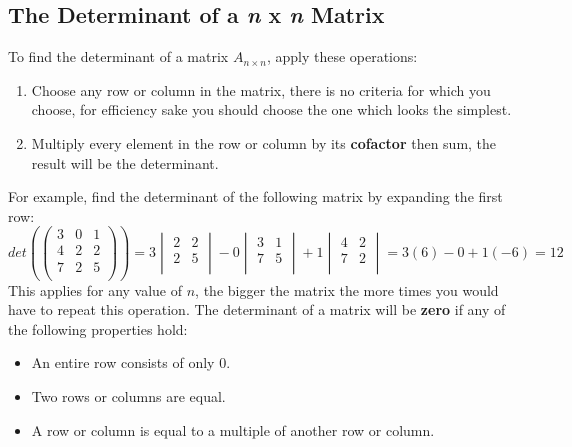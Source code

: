 \documentclass[a4paper]{article}
\begin{document}
  \subsection{The Determinant of a \textit{n} x \textit{n} Matrix}
  To find the determinant of a matrix $A_{n\times n}$, apply these operations:
  \begin{enumerate}
    \item Choose any row or column in the matrix, there is no criteria for which you choose, for efficiency sake you should choose the one which looks the simplest.
    \item Multiply every element in the row or column by its \textbf{cofactor} then sum, the result will be the determinant.
  \end{enumerate}
  For example, find the determinant of the following matrix by expanding the first row:
  \[
    det(
    \begin{pmatrix}
      3 & 0 & 1 \\
      4 & 2 & 2 \\
      7 & 2 & 5 \\
    \end{pmatrix}
    )=
    3 \begin{vmatrix}
      2 & 2 \\ 
      2 & 5 \\ 
    \end{vmatrix} -
    0 \begin{vmatrix}
      3 & 1 \\ 
      7 & 5 \\ 
    \end{vmatrix} + 
    1 \begin{vmatrix}
      4 & 2 \\ 
      7 & 2 \\ 
    \end{vmatrix} = 3(6) - 0 + 1(-6) = 12
  \]
  This applies for any value of $n$, the bigger the matrix the more times you would have to repeat this operation. The determinant of a matrix will be \textbf{zero} if any of the following properties hold:
  \begin{itemize}
    \item An entire row consists of only 0.
    \item Two rows or columns are equal.
    \item A row or column is equal to a multiple of another row or column.
  \end{itemize}
\end{document}
